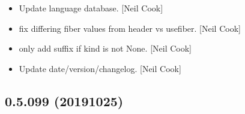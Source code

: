 \documentclass[a4paper,10pt,english]{report}
\begin{document}
\begin{itemize}
\item {} 
Update language database. {[}Neil Cook{]}

\item {} 
 \sphinxhyphen{} fix differing fiber values from header vs
usefiber. {[}Neil Cook{]}

\item {} 
 \sphinxhyphen{} only add suffix if kind is not None. {[}Neil Cook{]}

\item {} 
Update date/version/changelog. {[}Neil Cook{]}

\end{itemize}


\subsection{0.5.099 (2019\sphinxhyphen{}10\sphinxhyphen{}25)}
\end{document}
